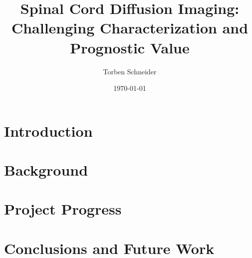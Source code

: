 \documentclass[a4paper]{scrreprt}
\begin{document}
 
\title{Spinal Cord Diffusion Imaging: Challenging Characterization and Prognostic Value} 
\date{\today} 
\author{Torben Schneider} 
\maketitle 
\chapter{Introduction} 
\chapter{Background} 
 
\chapter{Project Progress}
 

\chapter{Conclusions and Future Work}
\end{document}
